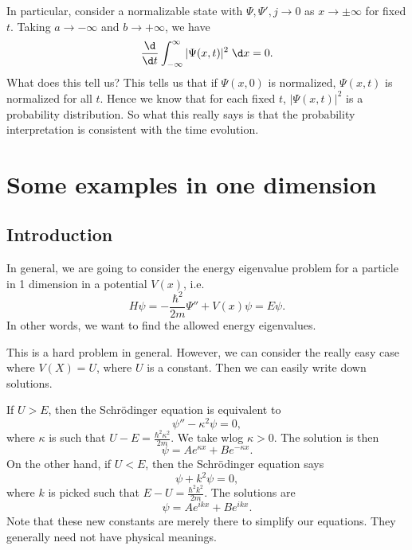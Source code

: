 \documentclass[a4paper]{article}
\begin{document}
In particular, consider a normalizable state with $\Psi, \Psi', j \to 0$ as $x \to \pm\infty$ for fixed $t$. Taking $a \to -\infty$ and $b\to +\infty$, we have
\[
  \frac{\d}{\d t}\int_{-\infty}^\infty |\Psi(x, t)|^2 \;\d x = 0.
\]
What does this tell us? This tells us that if $\Psi(x, 0)$ is normalized, $\Psi(x, t)$ is normalized for all $t$. Hence we know that for each fixed $t$, $|\Psi(x, t)|^2$ is a probability distribution. So what this really says is that the probability interpretation is consistent with the time evolution.

\section{Some examples in one dimension}
\subsection{Introduction}
In general, we are going to consider the energy eigenvalue problem for a particle in 1 dimension in a potential $V(x)$, i.e.
\[
  H\psi = -\frac{\hbar^2}{2m}\Psi'' + V(x) \psi = E\psi.
\]
In other words, we want to find the allowed energy eigenvalues.

This is a hard problem in general. However, we can consider the really easy case where $V(X) = U$, where $U$ is a constant. Then we can easily write down solutions.

If $U > E$, then the Schr\"odinger equation is equivalent to
\[
  \psi'' - \kappa^2 \psi = 0,
\]
where $\kappa$ is such that $U - E = \frac{\hbar^2 \kappa^2}{2m}$. We take wlog $\kappa > 0$. The solution is then
\[
  \psi = Ae^{\kappa x} + Be^{-\kappa x}.
\]
On the other hand, if $U < E$, then the Schr\"odinger equation says
\[
  \psi + k^2 \psi = 0,
\]
where $k$ is picked such that $E - U = \frac{\hbar^2 k^2}{2m}$. The solutions are
\[
  \psi = Ae^{ikx} + Be^{ikx}.
\]
Note that these new constants are merely there to simplify our equations. They generally need not have physical meanings.
\end{document}
